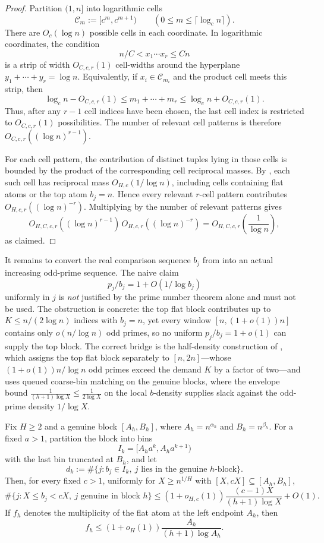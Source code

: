 \begin{proof}
Partition $(1,n]$ into logarithmic cells
\[
  \mathcal C_m:=[c^m,c^{m+1})\qquad
  (0\le m\le \lceil\log_c n\rceil).
\]
There are $O_c(\log n)$ possible cells in each coordinate.  In logarithmic
coordinates, the condition
\[
  n/C<x_1\cdots x_r\le Cn
\]
is a strip of width $O_{C,c,r}(1)$ cell-widths around the hyperplane
$y_1+\cdots+y_r=\log n$.  Equivalently, if
$x_i\in\mathcal C_{m_i}$ and the product cell meets this strip, then
\[
  \log_c n-O_{C,c,r}(1)
  \le
  m_1+\cdots+m_r
  \le
  \log_c n+O_{C,c,r}(1).
\]
Thus, after any $r-1$ cell indices have been chosen, the last cell index is
restricted to $O_{C,c,r}(1)$ possibilities.  The number of relevant cell
patterns is therefore $O_{C,c,r}((\log n)^{r-1})$.

For each cell pattern, the contribution of distinct tuples lying in those
cells is bounded by the product of the corresponding cell reciprocal masses.
By , each such cell has reciprocal mass
$O_{H,c}(1/\log n)$, including cells containing flat atoms or the top atom
$b_j=n$.  Hence every relevant $r$-cell pattern contributes
$O_{H,c,r}((\log n)^{-r})$.  Multiplying by the number of relevant patterns
gives
\[
  O_{H,C,c,r}((\log n)^{r-1})\,
  O_{H,c,r}((\log n)^{-r})
  =
  O_{H,C,c,r}\!\left(\frac1{\log n}\right),
\]
as claimed.
\end{proof}

It remains to convert the real comparison sequence $b_j$ from
 into an actual increasing odd-prime sequence.
The naive claim
\[
  p_j/b_j = 1 + O(1/\log b_j)
\]
uniformly in $j$ is \emph{not} justified by the prime number theorem alone and
must not be used.  The obstruction is concrete: the top flat block contributes
up to $K \le n/(2\log n)$ indices with $b_j = n$, yet every window
$[n,(1+o(1))n]$ contains only $o(n/\log n)$ odd primes, so no uniform
$p_j/b_j = 1 + o(1)$ can supply the top block.  The correct bridge is the
half-density construction of , which assigns the top
flat block separately to $[n,2n]$---whose $(1+o(1))n/\log n$ odd primes
exceed the demand $K$ by a factor of two---and uses queued coarse-bin
matching on the genuine blocks, where the envelope bound
$\tfrac{1}{(h+1)\log X}\le\tfrac{1}{2\log X}$ on the local $b$-density
supplies slack against the odd-prime density $1/\log X$.

\begin{lemma}\label{lem:bin-demand-estimate}
Fix $H\ge2$ and a genuine block $[A_h,B_h]$, where
$A_h=n^{\alpha_h}$ and $B_h=n^{\beta_h}$.  For a fixed $a>1$, partition the
block into bins
\[
  I_k=[A_ha^k,A_ha^{k+1})
\]
with the last bin truncated at $B_h$, and let
\[
  d_k:=\#\{j:b_j\in I_k,\ j\text{ lies in the genuine }h\text{-block}\}.
\]
Then, for every fixed $c>1$, uniformly for
$X\ge n^{1/H}$ with $[X,cX]\subseteq[A_h,B_h]$,
\[
  \#\{j:X\le b_j<cX,\ j\text{ genuine in block }h\}
  \le
  (1+o_{H,c}(1))\frac{(c-1)X}{(h+1)\log X}+O(1).
  \tag{7.2}\label{eq:genuine-bin-demand}
\]
If $f_h$ denotes the multiplicity of the flat atom at the left endpoint
$A_h$, then
\[
  f_h\le (1+o_H(1))\frac{A_h}{(h+1)\log A_h}.
  \tag{7.3}\label{eq:flat-atom-count}
\]
\end{lemma}

